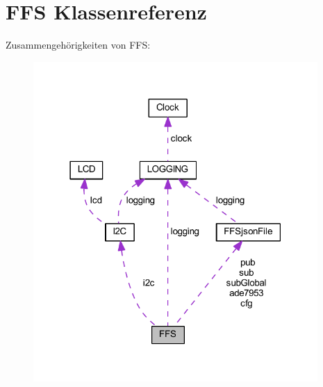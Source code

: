 \hypertarget{class_f_f_s}{}\section{F\+FS Klassenreferenz}
\label{class_f_f_s}


Zusammengehörigkeiten von F\+FS\+:\nopagebreak
\begin{figure}[H]
\begin{center}
\leavevmode
\includegraphics[width=307pt]{class_f_f_s__coll__graph}
\end{center}
\end{figure}
